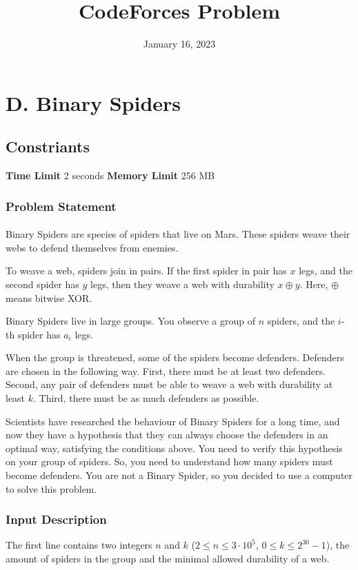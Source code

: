 \documentclass{article}
\title{CodeForces Problem}
\date{January 16, 2023}
\author{}
\begin{document}
\maketitle
\section*{D. Binary Spiders}
\subsection*{Constriants}
\textbf{Time Limit}
2 seconds
\hfill
\textbf{Memory Limit}
256 MB
\subsubsection*{Problem Statement}
\paragraph{}Binary Spiders are species of spiders that live on Mars. These spiders weave their webs to defend themselves from enemies.

To weave a web, spiders join in pairs. If the first spider in pair has $x$ legs, and the second spider has $y$ legs, then they weave a web with durability $x \oplus y$. Here, $\oplus$ means bitwise XOR.

Binary Spiders live in large groups. You observe a group of $n$ spiders, and the $i$-th spider has $a_i$ legs.

When the group is threatened, some of the spiders become defenders. Defenders are chosen in the following way. First, there must be at least two defenders. Second, any pair of defenders must be able to weave a web with durability at least $k$. Third, there must be as much defenders as possible.

Scientists have researched the behaviour of Binary Spiders for a long time, and now they have a hypothesis that they can always choose the defenders in an optimal way, satisfying the conditions above. You need to verify this hypothesis on your group of spiders. So, you need to understand how many spiders must become defenders. You are not a Binary Spider, so you decided to use a computer to solve this problem.
\paragraph{}
\subsubsection*{Input Description}The first line contains two integers $n$ and $k$ ($2 \le n \le 3\cdot10^5$, $0 \le k \le 2^{30} - 1$), the amount of spiders in the group and the minimal allowed durability of a web.
\end{document}
